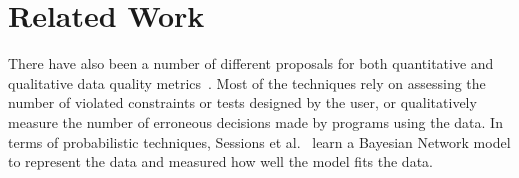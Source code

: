 \section{Related Work}
There have also been a number of different proposals for both quantitative and qualitative data quality metrics~\cite{DBLP:journals/cacm/PipinoLW02, DBLP:journals/jdiq/CheahP15, DBLP:journals/jdiq/EvenS09,DBLP:journals/jdiq/SessionsV09, DBLP:journals/tkde/FanGLX11,DBLP:journals/sigmetrics/KeetonMW09}.
Most of the techniques rely on assessing the number of violated constraints or tests designed by the user, or qualitatively measure the number of erroneous decisions made by programs using the data.
In terms of probabilistic techniques, Sessions et al.~\cite{DBLP:journals/jdiq/SessionsV09} learn a Bayesian Network model to represent the data and measured how well the model fits the data.
